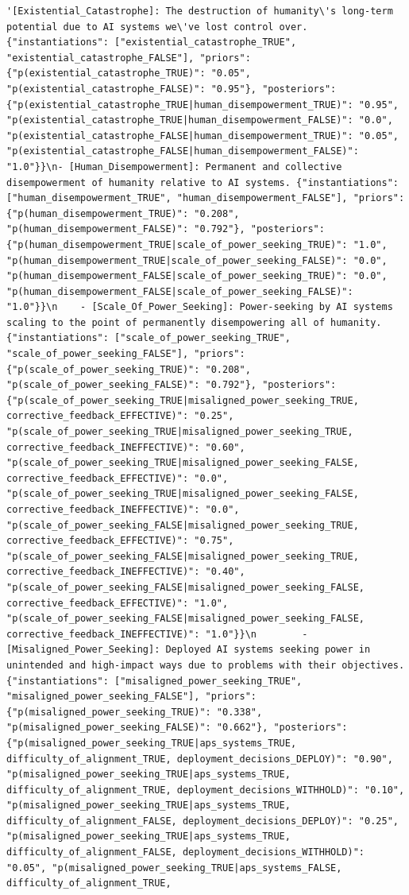 \documentclass[
  11pt,
  letterpaper,
]{book}
\begin{document}
\begin{verbatim}
'[Existential_Catastrophe]: The destruction of humanity\'s long-term potential due to AI systems we\'ve lost control over. {"instantiations": ["existential_catastrophe_TRUE", "existential_catastrophe_FALSE"], "priors": {"p(existential_catastrophe_TRUE)": "0.05", "p(existential_catastrophe_FALSE)": "0.95"}, "posteriors": {"p(existential_catastrophe_TRUE|human_disempowerment_TRUE)": "0.95", "p(existential_catastrophe_TRUE|human_disempowerment_FALSE)": "0.0", "p(existential_catastrophe_FALSE|human_disempowerment_TRUE)": "0.05", "p(existential_catastrophe_FALSE|human_disempowerment_FALSE)": "1.0"}}\n- [Human_Disempowerment]: Permanent and collective disempowerment of humanity relative to AI systems. {"instantiations": ["human_disempowerment_TRUE", "human_disempowerment_FALSE"], "priors": {"p(human_disempowerment_TRUE)": "0.208", "p(human_disempowerment_FALSE)": "0.792"}, "posteriors": {"p(human_disempowerment_TRUE|scale_of_power_seeking_TRUE)": "1.0", "p(human_disempowerment_TRUE|scale_of_power_seeking_FALSE)": "0.0", "p(human_disempowerment_FALSE|scale_of_power_seeking_TRUE)": "0.0", "p(human_disempowerment_FALSE|scale_of_power_seeking_FALSE)": "1.0"}}\n    - [Scale_Of_Power_Seeking]: Power-seeking by AI systems scaling to the point of permanently disempowering all of humanity. {"instantiations": ["scale_of_power_seeking_TRUE", "scale_of_power_seeking_FALSE"], "priors": {"p(scale_of_power_seeking_TRUE)": "0.208", "p(scale_of_power_seeking_FALSE)": "0.792"}, "posteriors": {"p(scale_of_power_seeking_TRUE|misaligned_power_seeking_TRUE, corrective_feedback_EFFECTIVE)": "0.25", "p(scale_of_power_seeking_TRUE|misaligned_power_seeking_TRUE, corrective_feedback_INEFFECTIVE)": "0.60", "p(scale_of_power_seeking_TRUE|misaligned_power_seeking_FALSE, corrective_feedback_EFFECTIVE)": "0.0", "p(scale_of_power_seeking_TRUE|misaligned_power_seeking_FALSE, corrective_feedback_INEFFECTIVE)": "0.0", "p(scale_of_power_seeking_FALSE|misaligned_power_seeking_TRUE, corrective_feedback_EFFECTIVE)": "0.75", "p(scale_of_power_seeking_FALSE|misaligned_power_seeking_TRUE, corrective_feedback_INEFFECTIVE)": "0.40", "p(scale_of_power_seeking_FALSE|misaligned_power_seeking_FALSE, corrective_feedback_EFFECTIVE)": "1.0", "p(scale_of_power_seeking_FALSE|misaligned_power_seeking_FALSE, corrective_feedback_INEFFECTIVE)": "1.0"}}\n        - [Misaligned_Power_Seeking]: Deployed AI systems seeking power in unintended and high-impact ways due to problems with their objectives. {"instantiations": ["misaligned_power_seeking_TRUE", "misaligned_power_seeking_FALSE"], "priors": {"p(misaligned_power_seeking_TRUE)": "0.338", "p(misaligned_power_seeking_FALSE)": "0.662"}, "posteriors": {"p(misaligned_power_seeking_TRUE|aps_systems_TRUE, difficulty_of_alignment_TRUE, deployment_decisions_DEPLOY)": "0.90", "p(misaligned_power_seeking_TRUE|aps_systems_TRUE, difficulty_of_alignment_TRUE, deployment_decisions_WITHHOLD)": "0.10", "p(misaligned_power_seeking_TRUE|aps_systems_TRUE, difficulty_of_alignment_FALSE, deployment_decisions_DEPLOY)": "0.25", "p(misaligned_power_seeking_TRUE|aps_systems_TRUE, difficulty_of_alignment_FALSE, deployment_decisions_WITHHOLD)": "0.05", "p(misaligned_power_seeking_TRUE|aps_systems_FALSE, difficulty_of_alignment_TRUE, 
\end{verbatim}
\end{document}
